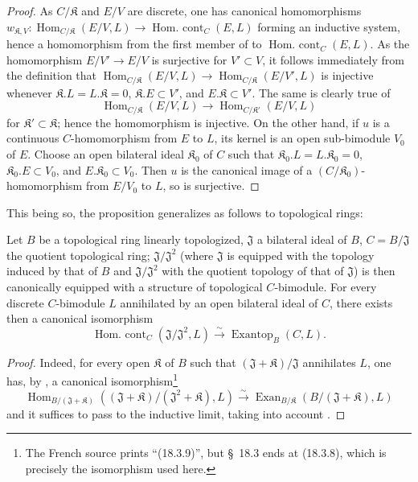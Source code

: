 \begin{proof}
As $C/\mathfrak K$ and $E/V$ are discrete, one has canonical homomorphisms $w_{\mathfrak K,V}:\operatorname{Hom}_{C/\mathfrak K}(E/V,L)
\longrightarrow\operatorname{Hom.\ cont}_C(E,L)$
forming an inductive system, hence a homomorphism from the first member of  to $\operatorname{Hom.\ cont}_C(E,L)$.
As the homomorphism $E/V'\to E/V$ is surjective for $V'\subset V$, it follows immediately from the definition that $\operatorname{Hom}_{C/\mathfrak K}(E/V,L)\to
\operatorname{Hom}_{C/\mathfrak K}(E/V',L)$
is injective whenever $\mathfrak K.L=L.\mathfrak K=0$, $\mathfrak K.E\subset V'$, and $E.\mathfrak K\subset V'$.
The same is clearly true of
\[
  \operatorname{Hom}_{C/\mathfrak K}(E/V,L)\to
  \operatorname{Hom}_{C/\mathfrak K'}(E/V,L)
\]
for $\mathfrak K'\subset\mathfrak K$; hence the homomorphism  is injective.
On the other hand, if $u$ is a continuous $C$-homomorphism from $E$ to $L$, its kernel is an open sub-bimodule $V_0$ of $E$.
Choose an open bilateral ideal $\mathfrak K_0$ of $C$ such that $\mathfrak K_0.L=L.\mathfrak K_0=0$, $\mathfrak K_0.E\subset V_0$, and $E.\mathfrak K_0\subset V_0$.
Then $u$ is the canonical image of a $(C/\mathfrak K_0)$-homomorphism from $E/V_0$ to $L$, so  is surjective.
\end{proof}

This being so, the proposition  generalizes as follows to topological rings:

\begin{proposition}[18.5.4]
\label{0.18.5.4}
Let $B$ be a topological ring linearly topologized, $\mathfrak{J}$ a bilateral ideal of $B$, $C=B/\mathfrak{J}$ the quotient topological ring; $\mathfrak{J}/\mathfrak{J}^2$ \textup{(}where $\mathfrak{J}$ is equipped with the topology induced by that of $B$ and $\mathfrak{J}/\mathfrak{J}^2$ with the quotient topology of that of $\mathfrak{J}$\textup{)} is then canonically equipped with a structure of topological $C$-bimodule.
For every discrete $C$-bimodule $L$ annihilated by an open bilateral ideal of $C$, there exists then a canonical isomorphism
\begin{equation}
\tag{18.5.4.1}
  \label{0.18.5.4.1}
  \operatorname{Hom.\ cont}_C(\mathfrak{J}/\mathfrak{J}^2,L)\xrightarrow{\sim}\operatorname{Exantop}_B(C,L).
\end{equation}
\end{proposition}

\begin{proof}
Indeed, for every open $\mathfrak K$ of $B$ such that $(\mathfrak{J}+\mathfrak K)/\mathfrak{J}$ annihilates $L$, one has, by , a canonical isomorphism\footnote{The French source prints ``(18.3.9)'', but \S~18.3 ends at (18.3.8), which is precisely the isomorphism used here.}
\[
  \operatorname{Hom}_{B/(\mathfrak{J}+\mathfrak K)}((\mathfrak{J}+\mathfrak K)/(\mathfrak{J}^2+\mathfrak K),L)\xrightarrow{\sim}\operatorname{Exan}_{B/\mathfrak K}(B/(\mathfrak{J}+\mathfrak K),L)
\]
and it suffices to pass to the inductive limit, taking into account .
\end{proof}
